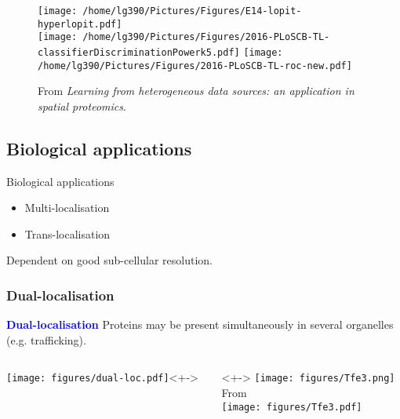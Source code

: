 \begin{frame}{}

  \begin{figure}[h]
    \centering
    \texttt{[image: /home/lg390/Pictures/Figures/E14-lopit-hyperlopit.pdf]} \\
    \texttt{[image: /home/lg390/Pictures/Figures/2016-PLoSCB-TL-classifierDiscriminationPowerk5.pdf]}
    \texttt{[image: /home/lg390/Pictures/Figures/2016-PLoSCB-TL-roc-new.pdf]}    
    \caption{{\footnotesize From \cite{Breckels:2016} \textit{Learning from
          heterogeneous data sources: an application in spatial
          proteomics}.}
    }
\label{fig:tlres}
  \end{figure}
  
\end{frame}

\subsection{Biological applications}

\begin{frame}{Biological applications}
  \begin{itemize}
  \item Multi-localisation
  \item Trans-localisation
  \end{itemize}
  Dependent on good sub-cellular resolution.
\end{frame}

\subsubsection{Dual-localisation}

\begin{frame}
  \textcolor{Blue}{\textbf{Dual-localisation}} Proteins may be
  present simultaneously in several organelles (e.g. trafficking).      
  \begin{columns}
    \begin{column}{.5\textwidth}
      \texttt{[image: figures/dual-loc.pdf]}<+->
    \end{column}
    \begin{column}{.5\textwidth}<+->
      \centering
      \texttt{[image: figures/Tfe3.png]}\\
      \tiny From \cite{Betschinger:2013} \\
      \texttt{[image: figures/Tfe3.pdf]}
    \end{column}  
  \end{columns}
\end{frame}

